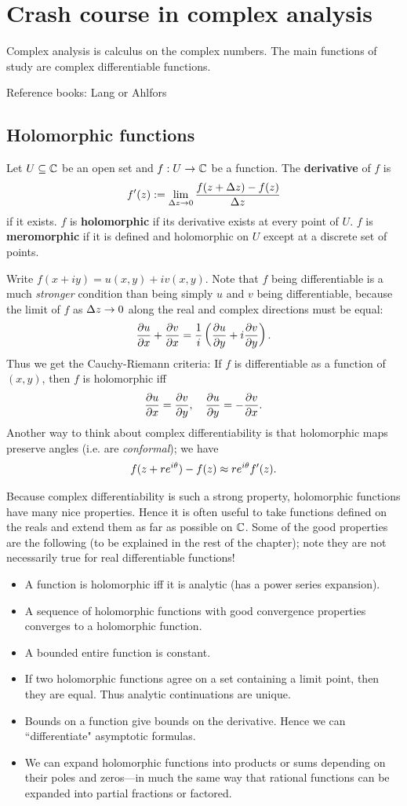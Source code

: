 \chapter{Crash course in complex analysis}
Complex analysis is calculus on the complex numbers. The main functions of study are complex differentiable functions.

Reference books: Lang or Ahlfors
\section{Holomorphic functions}
\begin{df}
Let $U\subseteq \mathbb{C}$ be an open set and $f:U\to \mathbb{C}$ be a function. The \textbf{derivative} of $f$ is
\[
f'(z):=\lim_{\Delta z\to 0} \frac{f(z+\Delta z)-f(z)}{\Delta z}
\]
if it exists. $f$ is \textbf{holomorphic} if its derivative exists at every point of $U$. $f$ is \textbf{meromorphic} if it is defined and holomorphic on $U$ except at a discrete set of points.
\end{df}
Write $f(x+iy)=u(x,y)+iv(x,y)$. Note that $f$ being differentiable is a much {\it stronger} condition than being simply $u$ and $v$ being differentiable, because the limit of $f$ as $\Delta z\to 0$ along the real and complex directions must be equal:
\[
\frac{\partial u}{\partial x}+\frac{\partial v}{\partial x} = \frac{1}{i} \left( {\frac{\partial u}{\partial y} +i\frac{\partial v}{\partial y}} \right).
\]
Thus we get the Cauchy-Riemann criteria: If $f$ is differentiable as a function of $(x,y)$, then $f$ is holomorphic iff
\[
\frac{\partial u}{\partial x}=\frac{\partial v}{\partial y},\quad \frac{\partial u}{\partial y} =-\frac{\partial v}{\partial x}.
\]
Another way to think about complex differentiability is that holomorphic maps preserve angles (i.e. are {\it conformal}); we have
\[
f(z+re^{i\theta}) -f(z)\approx re^{i\theta} f'(z).
\]

Because complex differentiability is such a strong property, holomorphic functions have many nice properties. Hence it is often useful to take functions defined on the reals and extend them as far as possible on $\mathbb{C}$. Some of the good properties are the following (to be explained in the rest of the chapter); note they are not necessarily true for real differentiable functions!
\begin{itemize}
\item
A function is holomorphic iff it is analytic (has a power series expansion).
\item
A sequence of holomorphic functions with good convergence properties converges to a holomorphic function.
\item A bounded entire function is constant.
\item If two holomorphic functions agree on a set containing a limit point, then they are equal. Thus analytic continuations are unique.
\item Bounds on a function give bounds on the derivative. Hence we can ``differentiate" asymptotic formulas.
\item We can expand holomorphic functions into products or sums depending on their poles and zeros---in much the same way that rational functions can be expanded into partial fractions or factored.
\end{itemize}
